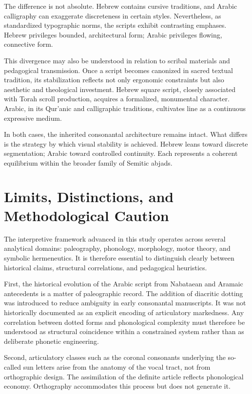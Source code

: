 \documentclass[11pt]{article}
\begin{document}
The difference is not absolute. Hebrew contains cursive traditions, and Arabic calligraphy can exaggerate discreteness in certain styles. Nevertheless, as standardized typographic norms, the scripts exhibit contrasting emphases. Hebrew privileges bounded, architectural form; Arabic privileges flowing, connective form.

This divergence may also be understood in relation to scribal materials and pedagogical transmission. Once a script becomes canonized in sacred textual tradition, its stabilization reflects not only ergonomic constraints but also aesthetic and theological investment. Hebrew square script, closely associated with Torah scroll production, acquires a formalized, monumental character. Arabic, in its Qur'anic and calligraphic traditions, cultivates line as a continuous expressive medium.

In both cases, the inherited consonantal architecture remains intact. What differs is the strategy by which visual stability is achieved. Hebrew leans toward discrete segmentation; Arabic toward controlled continuity. Each represents a coherent equilibrium within the broader family of Semitic abjads.

\section{Limits, Distinctions, and Methodological Caution}

The interpretive framework advanced in this study operates across several analytical domains: paleography, phonology, morphology, motor theory, and symbolic hermeneutics. It is therefore essential to distinguish clearly between historical claims, structural correlations, and pedagogical heuristics.

First, the historical evolution of the Arabic script from Nabataean and Aramaic antecedents is a matter of paleographic record. The addition of diacritic dotting was introduced to reduce ambiguity in early consonantal manuscripts. It was not historically documented as an explicit encoding of articulatory markedness. Any correlation between dotted forms and phonological complexity must therefore be understood as structural coincidence within a constrained system rather than as deliberate phonetic engineering.

Second, articulatory classes such as the coronal consonants underlying the so-called sun letters arise from the anatomy of the vocal tract, not from orthographic design. The assimilation of the definite article reflects phonological economy. Orthography accommodates this process but does not generate it.
\end{document}
